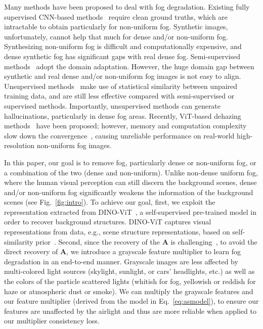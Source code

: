 \documentclass[runningheads]{llncs}
\begin{document}
Many methods have been proposed to deal with fog degradation.
Existing fully supervised CNN-based methods~\cite{cai2016dehazenet,li2017aod,zhang2018densely,qu2019enhanced,liu2019griddehazenet,dong2020multi,wu2021contrastive} require clean ground truths, which are intractable to obtain particularly for non-uniform fog.
Synthetic images, unfortunately, cannot help that much for dense and/or non-uniform fog. Synthesizing non-uniform fog is difficult and computationally expensive, and dense synthetic fog has significant gaps with real dense fog.
Semi-supervised methods~\cite{li2019semi,shao2020domain,chen2021psd,li2022physically} adopt the domain adaptation. However, the huge domain gap between synthetic and real dense and/or non-uniform fog images is not easy to align.
Unsupervised methods~\cite{huang2019towards,golts2019unsupervised,li2021you,zhao2021refinednet,yang2022self} make use of statistical similarity between unpaired training data,  and are still less effective compared with semi-supervised or supervised methods. Importantly, unsupervised methods can generate hallucinations, particularly in dense fog areas.
Recently, ViT-based dehazing methods~\cite{guo2022image,song2022vision} have been proposed; however, memory and computation complexity slow down the convergence~\cite{zhu2020deformable}, causing unreliable performance on real-world high-resolution non-uniform fog images.


In this paper, our goal is to remove fog, particularly dense or non-uniform fog, or a combination of the two (dense and non-uniform).
Unlike non-dense uniform fog, where the human visual perception can still discern the background scenes, dense and/or non-uniform fog significantly weakens the information of the background scenes (see Fig.~\ref{fig:intro}).
To achieve our goal, first, we exploit the representation extracted from DINO-ViT~\cite{caron2021emerging}, a self-supervised pre-trained model in order to recover background structures.
DINO-ViT captures visual representations from data, e.g., scene structure representations, based on self-similarity prior~\cite{shechtman2007matching}.
Second, since the recovery of the $\mathbf{A}$ is challenging~\cite{Sulami2014}, to avoid the direct recovery of $\mathbf{A}$, we introduce a grayscale feature multiplier to learn fog degradation in an end-to-end manner.
Grayscale images are less affected by multi-colored light sources (skylight, sunlight, or cars' headlights, etc.) as well as the colors of the particle scattered lights (whitish for fog, yellowish or reddish for haze or atmospheric dust or smoke).
We can multiply the grayscale features and our feature multiplier (derived from the model in Eq.~\eqref{eq:asmodel}), to ensure our features are unaffected by the airlight and thus are more reliable when applied to our multiplier consistency loss.
\end{document}
